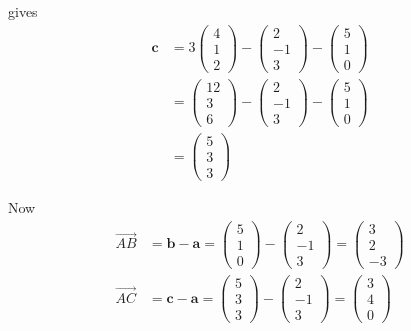 \documentclass[leqno]{article}
\begin{document}
\begin{enumerate}[
  label=\textbf{\arabic*.},
  leftmargin=*,
  topsep=0pt,
  partopsep=0pt,
  parsep=0pt
]
\begin{djsSolution}
\begin{enumerate}[label=\textbf{(\alph*)}]
gives
\begin{align*}
\mathbf{c}
&=3\begin{pmatrix}4\\1\\2\end{pmatrix}
-\begin{pmatrix}2\\-1\\3\end{pmatrix}
-\begin{pmatrix}5\\1\\0\end{pmatrix} \\
&=\begin{pmatrix}12\\3\\6\end{pmatrix}
-\begin{pmatrix}2\\-1\\3\end{pmatrix}
-\begin{pmatrix}5\\1\\0\end{pmatrix} \\
&=\begin{pmatrix}5\\3\\3\end{pmatrix}
\end{align*}

Now
\begin{align*}
\overrightarrow{AB}
&=\mathbf{b}-\mathbf{a}
=\begin{pmatrix}5\\1\\0\end{pmatrix}-\begin{pmatrix}2\\-1\\3\end{pmatrix}
=\begin{pmatrix}3\\2\\-3\end{pmatrix} \\
\overrightarrow{AC}
&=\mathbf{c}-\mathbf{a}
=\begin{pmatrix}5\\3\\3\end{pmatrix}-\begin{pmatrix}2\\-1\\3\end{pmatrix}
=\begin{pmatrix}3\\4\\0\end{pmatrix}
\end{align*}


\end{enumerate}
\end{djsSolution}
\end{enumerate}
\end{document}
